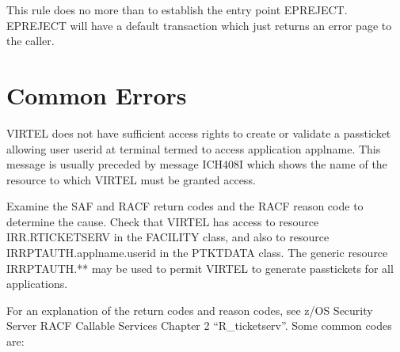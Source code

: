 \documentclass[letterpaper,10pt,english]{sphinxmanual}
\begin{document}
\sphinxAtStartPar
This rule does no more than to establish the entry point EPREJECT. EPREJECT will have a default transaction which just returns an error page to the caller.

\newpage

\ignorespaces 

\section{Common Errors}
\label{\detokenize{connectivity_guide:common-errors}}\label{\detokenize{connectivity_guide:index-173}}
\sphinxAtStartPar
{}

\sphinxAtStartPar
VIRTEL does not have sufficient access rights to create or validate a passticket allowing user userid at terminal termed to access application applname. This message is usually preceded by message ICH408I which shows the name of the resource to which VIRTEL must be granted access.

\sphinxAtStartPar
{}

\sphinxAtStartPar
Examine the SAF and RACF return codes and the RACF reason code to determine the cause. Check that VIRTEL has access to resource IRR.RTICKETSERV in the FACILITY class, and also to resource IRRPTAUTH.applname.userid in the PTKTDATA class. The generic resource IRRPTAUTH.** may be used to permit VIRTEL to generate passtickets for all applications.

\sphinxAtStartPar
For an explanation of the return codes and reason codes, see z/OS Security Server RACF Callable Services Chapter 2 “R\_ticketserv”. Some common codes are:
\end{document}
